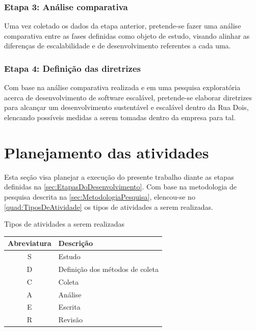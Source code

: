 \subsubsection{Etapa 3: Análise comparativa}

Uma vez coletado os dados da etapa anterior, pretende-se fazer uma análise comparativa
entre as fases definidas como objeto de estudo, visando alinhar as diferenças de
escalabilidade e de desenvolvimento referentes a cada uma.

\subsubsection{Etapa 4: Definição das diretrizes}

Com base na análise comparativa realizada e em uma pesquisa exploratória acerca de
desenvolvimento de software escalável, pretende-se elaborar diretrizes para alcançar
um desenvolvimento sustentável e escalável dentro da Rua Dois, elencando possíveis
medidas a serem tomadas dentro da empresa para tal.


\section{Planejamento das atividades}

Esta seção visa planejar a execução do presente trabalho diante as etapas definidas
na \autoref{sec:EtapasDoDesenvolvimento}. Com base na metodologia de pesquisa descrita
na \autoref{sec:MetodologiaPesquisa}, elencou-se no \autoref{quad:TiposDeAtividade}
os tipos de atividades a serem realizadas.

\begin{quadro}
    \caption{Tipos de atividades a serem realizadas\label{quad:TiposDeAtividade}}
    \begin{tabular}{ | c | l | }
    \hline
    \textbf{Abreviatura} &
        \textbf{Descrição} \\ \hline
        S & Estudo \\ \hline
        D & Definição dos métodos de coleta \\ \hline
        C & Coleta \\ \hline
        A & Análise \\ \hline
        E & Escrita \\ \hline
        R & Revisão \\ \hline
    \end{tabular}
\end{quadro}

